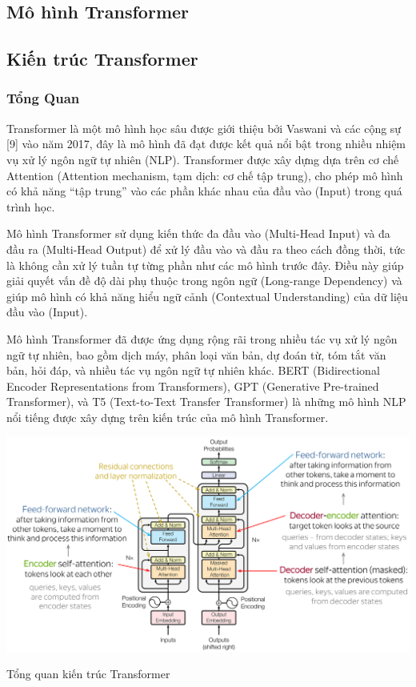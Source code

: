 \documentclass[a4paper, 12pt, openany]{book}
\begin{document}
\subsection{Mô hình Transformer}
\subsection{Kiến trúc Transformer}
\subsubsection{Tổng Quan}

Transformer\cite{Wolf2019HuggingFacesTS} là một mô hình học sâu được giới thiệu bởi Vaswani và các cộng sự [9]
vào năm 2017, đây là mô hình đã đạt được kết quả nổi bật trong nhiều nhiệm vụ xử lý
ngôn ngữ tự nhiên (NLP). Transformer được xây dựng dựa trên cơ chế Attention
(Attention mechanism, tạm dịch: cơ chế tập trung), cho phép mô hình có khả năng “tập
trung” vào các phần khác nhau của đầu vào (Input) trong quá trình học.

Mô hình Transformer sử dụng kiến thức đa đầu vào (Multi-Head Input) và đa đầu
ra (Multi-Head Output) để xử lý đầu vào và đầu ra theo cách đồng thời, tức là không cần
xử lý tuần tự từng phần như các mô hình trước đây. Điều này giúp giải quyết vấn đề độ
dài phụ thuộc trong ngôn ngữ (Long-range Dependency) và giúp mô hình có khả năng
hiểu ngữ cảnh (Contextual Understanding) của dữ liệu đầu vào (Input).

Mô hình Transformer đã được ứng dụng rộng rãi trong nhiều tác vụ xử lý ngôn ngữ
tự nhiên, bao gồm dịch máy, phân loại văn bản, dự đoán từ, tóm tắt văn bản, hỏi đáp, và
nhiều tác vụ ngôn ngữ tự nhiên khác. BERT\cite{devlin2019bert} (Bidirectional Encoder Representations from
Transformers), GPT\cite{brown2020language} (Generative Pre-trained Transformer), và T5\cite{raffel2023exploring} (Text-to-Text Transfer
Transformer) là những mô hình NLP nổi tiếng được xây dựng trên kiến trúc của mô hình
Transformer.

\begin{minipage}{\linewidth}
    \captionsetup{type=figure}
    \centering
    \includegraphics[width=\linewidth]{./assets/images/transformer.png}
    \caption{Tổng quan kiến trúc Transformer\cite{voita-etal-2019-good}}
\end{minipage}
\end{document}
